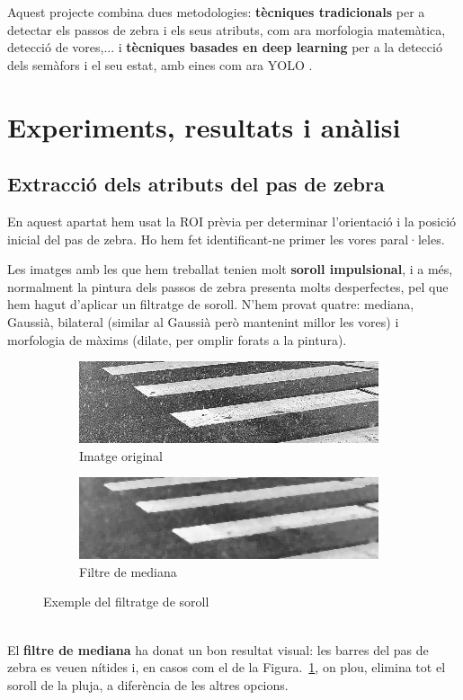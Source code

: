 \documentclass[10pt,a4paper,twocolumn,twoside]{article}
\begin{document}
 Aquest projecte combina dues metodologies: \textbf{tècniques tradicionals} per a detectar els passos de zebra i els seus atributs, com ara morfologia matemàtica, detecció de vores,... i \textbf{tècniques basades en deep learning} per a la detecció dels semàfors i el seu estat, amb eines com ara YOLO \cite{YOLO}.
 
\section{Experiments, resultats i anàlisi}

\subsection{Extracció dels atributs del pas de zebra}

En aquest apartat hem usat la ROI prèvia per determinar l’orientació i la posició inicial del pas de zebra. Ho hem fet identificant-ne primer les vores paral·leles.

Les imatges amb les que hem treballat tenien molt \textbf{soroll impulsional}, i a més, normalment la pintura dels passos de zebra presenta molts desperfectes, pel que hem hagut d'aplicar un filtratge de soroll. N'hem provat quatre: mediana, Gaussià, bilateral (similar al Gaussià però mantenint millor les vores) i morfologia de màxims (dilate, per omplir forats a la pintura).
\begin{figure}[!h]
	\centering
	\begin{subfigure}{0.46\columnwidth}
		\includegraphics[width=\linewidth]{figs/neu1}
		\caption{Imatge original}
	\end{subfigure}
	\quad
	\begin{subfigure}{0.46\columnwidth}
		\includegraphics[width=\linewidth]{figs/med_neu1}
		\caption{Filtre de mediana}
	\end{subfigure}
	\caption{Exemple del filtratge de soroll}
	\label{fig:soroll}
\end{figure}
\\
El \textbf{filtre de mediana} ha donat un bon resultat visual: les barres del pas de zebra es veuen nítides i, en casos com el de la Figura.~\ref{fig:soroll}, on plou, elimina tot el soroll de la pluja, a diferència de les altres opcions.
\end{document}
